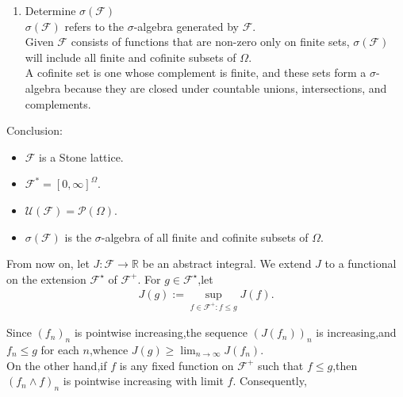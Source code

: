 \documentclass{report}
\begin{document}
{\begin{myproof}
\begin{enumerate}
\item Determine \(\sigma(\mathcal{F})\)\\
\(\sigma(\mathcal{F})\) refers to the \(\sigma\)-algebra generated by \(\mathcal{F}\).\\
Given \(\mathcal{F}\) consists of functions that are non-zero only on finite sets, \(\sigma(\mathcal{F})\) will include all finite and cofinite subsets of \(\Omega\).\\
A cofinite set is one whose complement is finite, and these sets form a \(\sigma\)-algebra because they are closed under countable unions, intersections, and complements.
\end{enumerate}
Conclusion:
\begin{itemize}
\item \(\mathcal{F}\) is a Stone lattice.
\item \(\mathcal{F}^* = [0, \infty]^\Omega\).
\item \(\mathcal{U}(\mathcal{F}) = \mathcal{P}(\Omega)\).
\item \(\sigma(\mathcal{F})\) is the \(\sigma\)-algebra of all finite and cofinite subsets of \(\Omega\).
\end{itemize}
\end{myproof}
From now on, let $J:\mathcal{F}\to\mathbb{R}$ be an abstract integral. We extend $J$ to a functional on the extension $\mathcal{F}^{\star}$ of $\mathcal{F}^+$. For $g\in\mathcal{F}^{\star}$,let
\begin{align*}
    J(g):=\sup_{f\in\mathcal{F}^+:f\leq g}J(f).
\end{align*}
\begin{myproof}
    Since $(f_n)_n$ is pointwise increasing,the sequence $(J(f_n))_n$ is increasing,and $f_n\leq g$ for each $n$,whence $J(g)\geq\lim_{n\to\infty}J(f_n)$.\\
    On the other hand,if $f$ is any fixed function on $\mathcal{F}^+$ such that $f\leq g$,then $(f_n\wedge f)_n$ is pointwise increasing with limit $f$. Consequently,

\end{myproof}}
\end{document}
